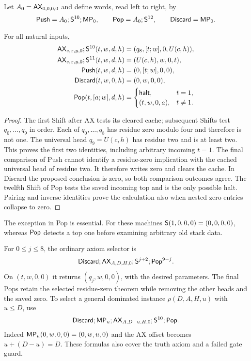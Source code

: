 Let $A_0=\mathsf{AX}_{0,0,0,0}$ and define words, read left to right, by
\[
 \mathsf{Push}=A_0;\mathsf{S}^{10};\mathsf{MP}_0,\qquad
 \mathsf{Pop}=A_0;\mathsf{S}^{12},\qquad
 \mathsf{Discard}=\mathsf{MP}_0.
\]

\begin{lemma}
For all natural inputs,
\begin{align*}
 \mathsf{AX}_{c,x,y,0};\mathsf{S}^{10}(t,w,d,h)
    &=(q_8,[t;w],0,U(c,h)),\\
 \mathsf{AX}_{c,x,y,0};\mathsf{S}^{11}(t,w,d,h)
    &=(U(c,h),w,0,t),\\
 \mathsf{Push}(t,w,d,h)&=(0,[t;w],0,0),\\
 \mathsf{Discard}(t,w,0,h)&=(0,w,0,0),\\
 \mathsf{Pop}(t,[a;w],d,h)&=
 \begin{cases}
  \mathsf{halt},&t=1,\\
  (t,w,0,a),&t\ne1.
 \end{cases}
\end{align*}
\end{lemma}

\begin{proof}
The first Shift after AX tests its cleared cache; subsequent Shifts
test $q_0,\ldots,q_9$ in order. Each of $q_0,\ldots,q_8$ has residue
zero modulo four and therefore is not one. The universal head
$q_9=U(c,h)$ has residue two and is at least two. This proves the
first two identities, including arbitrary incoming $t=1$.
The final comparison of Push cannot identify a residue-zero
implication with the cached universal head of residue two. It therefore
writes zero and clears the cache. In Discard the proposed conclusion
is zero, so both comparison outcomes agree. The twelfth Shift of Pop
tests the saved incoming top and is the only possible halt. Pairing
and inverse identities prove the calculation also when nested
zero entries collapse to zero.
\end{proof}

The exception in Pop is essential. For these machines
$\mathsf{S}(1,0,0,0)=(0,0,0,0)$, whereas $\mathsf{Pop}$ detects a top one before
examining arbitrary old stack data.

For $0\le j\le8$, the ordinary axiom selector is
\[
 \mathsf{Discard};\mathsf{AX}_{A,D,H,0};\mathsf{S}^{j+2};\mathsf{Pop}^{9-j}.
\]
On $(t,w,0,0)$ it returns $(q_j,w,0,0)$, with the desired parameters.
The final Pops retain the selected residue-zero theorem while removing
the other heads and the saved zero. To select a general dominated
instance $\rho(D,A,H,u)$ with $u\le D$, use
\[
 \mathsf{Discard};\mathsf{MP}_u;\mathsf{AX}_{A,D-u,H,0};\mathsf{S}^{10};\mathsf{Pop}.
\]
Indeed $\mathsf{MP}_u(0,w,0,0)=(0,w,u,0)$ and the AX offset becomes
$u+(D-u)=D$. These formulas also cover the truth axiom and a failed
gate guard.

